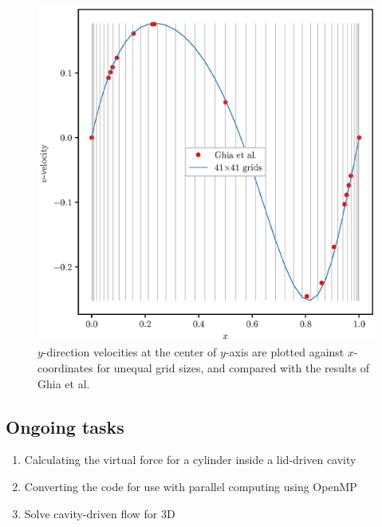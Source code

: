 \documentclass[12pt,a4paper,fleqn]{article}
\begin{document}
\begin{figure}[H]
    \centering
    \includegraphics[width=\linewidth]{unequal_cavityFlowV.eps}
    \caption{\(y\)-direction velocities at the center of \(y\)-axis are plotted against \(x\)-coordinates for unequal grid sizes, and compared with the results of Ghia et al.}
\end{figure}

\subsection{Ongoing tasks}
\begin{enumerate}
    \item Calculating the virtual force for a cylinder inside a lid-driven cavity
    \item Converting the code for use with parallel computing using OpenMP
    \item Solve cavity-driven flow for 3D
\end{enumerate}
\end{document}
